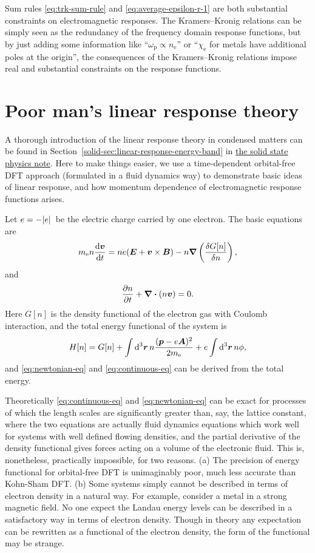 \documentclass[hyperref, a4paper]{article}
\newcommand{\soliddoc}{\href{../solid/solid}{the solid state physics note}}
\begin{document}
Sum rules \eqref{eq:trk-sum-rule} and \eqref{eq:average-epsilon-r-1} are both substantial constraints on electromagnetic responses.
The Kramers–Kronig relations can be simply seen as the redundancy of the frequency domain response functions, but by just adding some information like ``$\omega_\text{p} \propto n_\text{e}$'' or ``$\chi_\text{e}$ for metals have additional poles at the origin'', the consequences of the Kramers–Kronig relations impose real and substantial constraints on the response functions.

\section{Poor man's linear response theory}

A thorough introduction of the linear response theory in condensed matters can be found in Section~\ref{solid-sec:linear-response-energy-band} in \soliddoc.
Here to make things easier, we use a time-dependent orbital-free DFT approach (formulated in a fluid dynamics way) to demonstrate basic ideas of linear response, and how momentum dependence of electromagnetic response functions arises.

Let $e = - \abs*{e}$ be the electric charge carried by one electron. The basic equations are 
\begin{equation}
    m_\text{e} n \dv{\vb*{v}}{t} = n e (\vb*{E} + \vb*{v} \times \vb*{B}) - n \grad \left(\fdv{G[n]}{n}\right),
    \label{eq:newtonian-eq}
\end{equation}
and 
\begin{equation}
    \pdv{n}{t} + \div{(n \vb*{v})} = 0.
    \label{eq:continuous-eq}
\end{equation}
Here $G[n]$ is the density functional of the electron gas with Coulomb interaction, and the total energy functional of the system is 
\begin{equation}
    H[n] = G[n] + \int \dd[3]{\vb*{r}} n \frac{(\vb*{p} - e \vb*{A})^2}{2m_\text{e}} + e \int \dd[3]{\vb*{r}} n \phi,
\end{equation}
and \eqref{eq:newtonian-eq} and \eqref{eq:continuous-eq} can be derived from the total energy.

Theoretically \eqref{eq:continuous-eq} and \eqref{eq:newtonian-eq} can be exact for processes of which the length scales are significantly greater than, say, the lattice constant, where the two equations are actually fluid dynamics equations which work well for systems with well defined flowing densities, and the partial derivative of the density functional gives forces acting on a volume of the electronic fluid.
This is, nonetheless, practically impossible, for two reasons.
(a) The precision of energy functional for orbital-free DFT is unimaginably poor, much less accurate than Kohn-Sham DFT.
(b) Some systems simply cannot be described in terms of electron density in a natural way. For example, consider a metal in a strong magnetic field. No one expect the Landau energy levels can be described in a satisfactory way in terms of electron density. Though in theory any expectation can be rewritten as a functional of the electron density, the form of the functional may be strange.
\end{document}
